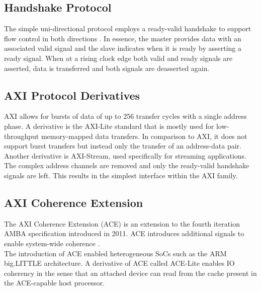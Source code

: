 \subsection{Handshake Protocol}
The simple uni-directional protocol employs a ready-valid handshake to support flow control in both directions \cite{xilinx-xapp1293}. In essence, the master provides data with an associated valid signal and the slave indicates when it is ready by asserting a ready signal. When at a rising clock edge both valid and ready signals are asserted, data is transferred and both signals are deasserted again.

    

\subsection{AXI Protocol Derivatives}
AXI allows for bursts of data of up to 256 transfer cycles with a single address phase. A derivative is the AXI-Lite standard that is mostly used for low-throughput memory-mapped data transfers. In comparison to AXI, it does not support burst transfers but instead only the transfer of an address-data pair. Another derivative is AXI-Stream, used specifically for streaming applications. The complex address channels are removed and only the ready-valid handshake signals are left. This results in the simplest interface within the AXI family.



\subsection{AXI Coherence Extension}
The AXI Coherence Extension (ACE) \cite{amba4} is an extension to the fourth iteration AMBA specification introduced in 2011. ACE introduces additional signals to enable system-wide coherence \cite{axi-coherence}.\\
The introduction of ACE enabled heterogeneous SoCs such as the ARM big.LITTLE architecture. A derivative of ACE called ACE-Lite enables IO coherency in the sense that an attached device can read from the cache present in the ACE-capable host processor.







